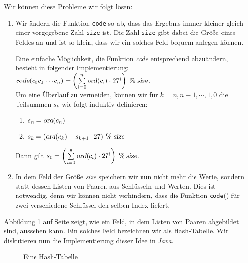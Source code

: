 Wir k\"onnen diese Probleme wir folgt l\"osen:
\begin{enumerate}
\item Wir \"andern die Funktion \texttt{code} so ab, dass das Ergebnis
      immer kleiner-gleich einer vorgegebene Zahl \texttt{size} ist.  Die Zahl
      \texttt{size} gibt dabei die Gr\"o{\ss}e eines Feldes an und ist so klein,
      dass wir ein solches Feld bequem anlegen k\"onnen.

      Eine einfache M\"oglichkeit, die Funktion \textsl{code} entsprechend abzu\"andern,
      besteht in folgender Implementierung: \\[0.2cm]
      \hspace*{1.3cm} 
      $\textsl{code}(c_0c_1\cdots c_n) = \left(\sum\limits_{i=0}^n \textsl{ord}(c_i) \cdot 27^i\right) \;\%\; \textsl{size}$.
      \\[0.2cm]
      Um eine \"Uberlauf zu vermeiden, k\"onnen wir f\"ur $k=n,n-1,\cdots,1,0$ die Teilsummen $s_k$
      wie folgt induktiv definieren:
      \begin{enumerate}
      \item $s_n = \textsl{ord}(c_n)$
      \item $s_{k} = \left(\textsl{ord}(c_{k}) + s_{k+1} \cdot 27 \right) \;\%\; \textsl{size}$
      \end{enumerate}
      Dann gilt
      \hspace*{1.3cm} 
      $s_0 = \left(\sum\limits_{i=0}^n \textsl{ord}(c_i) \cdot 27^i\right) \;\%\; \textsl{size}$.
      
\item In dem Feld der Gr\"o{\ss}e \textsl{size} speichern wir nun nicht mehr die Werte, sondern statt dessen
      Listen von Paaren aus Schl\"usseln und Werten.  Dies ist notwendig, denn wir k\"onnen
      nicht verhindern, dass die Funktion \texttt{code}() f\"ur zwei verschiedene
      Schl\"ussel den selben Index liefert.
\end{enumerate}
Abbildung \ref{fig:hash-example} auf Seite \pageref{fig:hash-example} zeigt, wie ein Feld,
in dem Listen von Paaren abgebildet sind, aussehen kann.  Ein solches Feld bezeichnen wir
als Hash-Tabelle.  Wir diskutieren nun die Implementierung dieser Idee in \textsl{Java}.


\begin{figure}[!ht]
  \centering
  \caption{Eine Hash-Tabelle}
  \label{fig:hash-example}
\end{figure}


